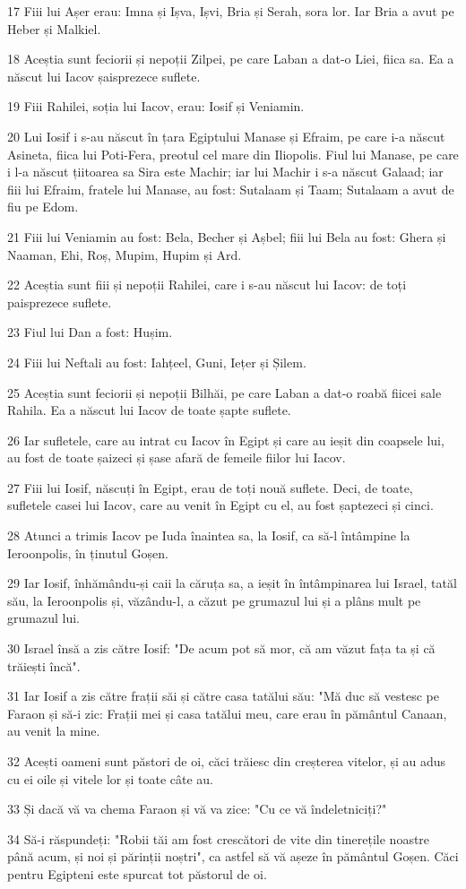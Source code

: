 \par 17 Fiii lui Așer erau: Imna și Ișva, Ișvi, Bria și Serah, sora lor. Iar Bria a avut pe Heber și Malkiel.
\par 18 Aceștia sunt feciorii și nepoții Zilpei, pe care Laban a dat-o Liei, fiica sa. Ea a născut lui Iacov șaisprezece suflete.
\par 19 Fiii Rahilei, soția lui Iacov, erau: Iosif și Veniamin.
\par 20 Lui Iosif i s-au născut în țara Egiptului Manase și Efraim, pe care i-a născut Asineta, fiica lui Poti-Fera, preotul cel mare din Iliopolis. Fiul lui Manase, pe care i l-a născut țiitoarea sa Sira este Machir; iar lui Machir i s-a născut Galaad; iar fiii lui Efraim, fratele lui Manase, au fost: Sutalaam și Taam; Sutalaam a avut de fiu pe Edom.
\par 21 Fiii lui Veniamin au fost: Bela, Becher și Așbel; fiii lui Bela au fost: Ghera și Naaman, Ehi, Roș, Mupim, Hupim și Ard.
\par 22 Aceștia sunt fiii și nepoții Rahilei, care i s-au născut lui Iacov: de toți paisprezece suflete.
\par 23 Fiul lui Dan a fost: Hușim.
\par 24 Fiii lui Neftali au fost: Iahțeel, Guni, Iețer și Șilem.
\par 25 Aceștia sunt feciorii și nepoții Bilhăi, pe care Laban a dat-o roabă fiicei sale Rahila. Ea a născut lui Iacov de toate șapte suflete.
\par 26 Iar sufletele, care au intrat cu Iacov în Egipt și care au ieșit din coapsele lui, au fost de toate șaizeci și șase afară de femeile fiilor lui Iacov.
\par 27 Fiii lui Iosif, născuți în Egipt, erau de toți nouă suflete. Deci, de toate, sufletele casei lui Iacov, care au venit în Egipt cu el, au fost șaptezeci și cinci.
\par 28 Atunci a trimis Iacov pe Iuda înaintea sa, la Iosif, ca să-l întâmpine la Ieroonpolis, în ținutul Goșen.
\par 29 Iar Iosif, înhămându-și caii la căruța sa, a ieșit în întâmpinarea lui Israel, tatăl său, la Ieroonpolis și, văzându-l, a căzut pe grumazul lui și a plâns mult pe grumazul lui.
\par 30 Israel însă a zis către Iosif: "De acum pot să mor, că am văzut fața ta și că trăiești încă".
\par 31 Iar Iosif a zis către frații săi și către casa tatălui său: "Mă duc să vestesc pe Faraon și să-i zic: Frații mei și casa tatălui meu, care erau în pământul Canaan, au venit la mine.
\par 32 Acești oameni sunt păstori de oi, căci trăiesc din creșterea vitelor, și au adus cu ei oile și vitele lor și toate câte au.
\par 33 Și dacă vă va chema Faraon și vă va zice: "Cu ce vă îndeletniciți?"
\par 34 Să-i răspundeți: "Robii tăi am fost crescători de vite din tinerețile noastre până acum, și noi și părinții noștri", ca astfel să vă așeze în pământul Goșen. Căci pentru Egipteni este spurcat tot păstorul de oi.

